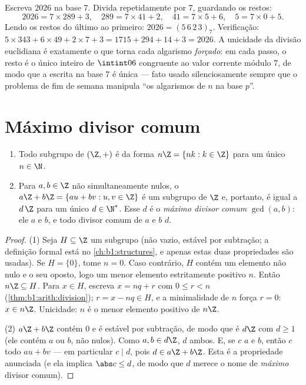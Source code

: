 \begin{example}\label{ex:b1:arith:base7}
Escreva $2026$ na base $7$. Divida repetidamente por $7$, guardando os
restos:
\[
2026 = 7 \times 289 + 3, \quad
289 = 7 \times 41 + 2, \quad
41 = 7 \times 5 + 6, \quad
5 = 7 \times 0 + 5 .
\]
Lendo os restos do último ao primeiro: $2026 =
(5\,6\,2\,3)_7$. Verificação: $5 \times 343 + 6 \times 49 + 2 \times 7
+ 3 = 1715 + 294 + 14 + 3 = 2026$. A unicidade da divisão
euclidiana é exatamente o que torna cada algarismo \emph{forçado}: em
cada passo, o resto é o único inteiro de $\intint06$ congruente
ao valor corrente módulo $7$, de modo que a escrita na base $7$ é única
--- fato usado silenciosamente sempre que o problema de fim de semana
manipula ``os algarismos de $n$ na base $p$''.
\end{example}

\section{Máximo divisor comum}

\begin{theorem}\label{thm:b1:arith:gcd}
\begin{enumerate}
  \item Todo subgrupo de $(\Z, +)$ é da forma $n\Z = \{nk : k
        \in \Z\}$ para um único $n \in \N$.
  \item Para $a, b \in \Z$ não simultaneamente nulos, o  $a\Z + b\Z = \{au +
        bv : u, v \in \Z\}$ é um subgrupo de $\Z$ e, portanto, é igual a
        $d\,\Z$ para um único $d \in \N^*$. Esse $d$ é o
        \emph{máximo divisor comum}
        $\gcd(a, b)$: ele  $a$ e $b$, e todo divisor comum de $a$ e
        $b$  $d$.
\end{enumerate}
\end{theorem}

\begin{proof}
(1) Seja $H \subseteq \Z$ um subgrupo (não vazio, estável por
subtração; a definição formal está no \cref{ch:b1:structures},
e apenas estas duas propriedades são usadas). Se $H = \{0\}$, tome $n = 0$.
Caso contrário, $H$ contém um elemento não nulo e o seu oposto, logo um
menor elemento estritamente positivo $n$. Então $n\Z \subseteq H$. Para $x
\in H$, escreva $x = nq + r$ com $0 \leq r < n$
(\cref{thm:b1:arith:division}); $r = x - nq \in H$, e a minimalidade de
$n$ força $r = 0$: $x \in n\Z$. Unicidade: $n$ é o menor elemento
positivo de $n\Z$.

(2) $a\Z + b\Z$ contém $0$ e é estável por subtração, de modo que é
$d\Z$ com $d \geq 1$ (ele contém $a$ ou $b$, não nulos). Como $a, b
\in d\Z$, $d$  ambos. E, se $c$  $a$ e $b$, então $c$
 todo $au + bv$ --- em particular $c \mid d$, pois $d \in a\Z
+ b\Z$. Esta é a propriedade anunciada (e ela implica $\abs c \leq
d$, de modo que $d$ merece o nome de \emph{máximo} divisor comum).
\end{proof}

